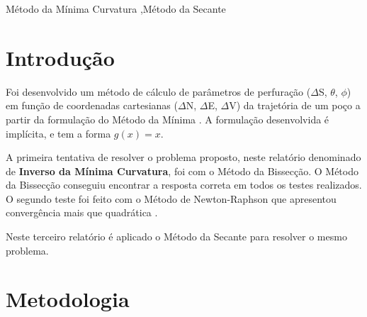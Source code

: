\documentclass[final,5p]{elsarticle}
\numberwithin{equation}{section}
\begin{document}
\begin{frontmatter}
\begin{abstract}
\end{abstract}




\begin{keyword}
    Método da Mínima Curvatura \sep Método da Secante



\end{keyword}

\end{frontmatter}


\section{Introdução}

Foi desenvolvido um método de cálculo de parâmetros de perfuração ($\Delta$S, $\theta$, $\phi$) em função de coordenadas cartesianas ($\Delta$N, $\Delta$E, $\Delta$V) da trajetória de um poço a partir da formulação do Método da Mínima \cite{relatoriobisseccao}. A formulação desenvolvida é implícita, e tem a forma $g(x)=x$.

A primeira tentativa de resolver o problema proposto, neste relatório denominado de \textbf{Inverso da Mínima Curvatura}, foi com o Método da Bissecção. O Método da Bissecção conseguiu encontrar a resposta correta em todos os testes realizados. O segundo teste foi feito com o Método de Newton-Raphson que apresentou convergência mais que quadrática \cite{relatorionewtonraphson}.

Neste terceiro relatório é aplicado o Método da Secante para resolver o mesmo problema.

\section{Metodologia}
\end{document}
